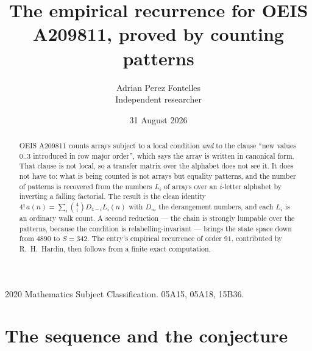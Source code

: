\documentclass[11pt,a4paper]{article}
\title{The empirical recurrence for OEIS A209811, proved by counting patterns}
\author{Adrian Perez Fontelles\\ \small Independent researcher}
\date{31 August 2026}
\theoremstyle{plain}
\theoremstyle{definition}
\begin{document}
\maketitle

\begin{abstract}
OEIS A209811 counts arrays subject to a local condition \emph{and} to the clause ``new values
$0..3$ introduced in row major order'', which says the array is written in canonical
form. That clause is not local, so a transfer matrix over the alphabet does not see it. It
does not have to: what is being counted is not arrays but equality patterns, and the number
of patterns is recovered from the numbers $L_i$ of arrays over an $i$-letter alphabet by
inverting a falling factorial. The result is the clean identity
$4!\,a(n)=\sum_i\binom{4}{i}D_{4-i}L_i(n)$ with $D_m$ the derangement numbers,
and each $L_i$ is an ordinary walk count. A second reduction --- the chain is strongly
lumpable over the patterns, because the condition is relabelling-invariant --- brings the
state space down from $4890$ to $S=342$. The entry's empirical recurrence of order
$91$, contributed by R.~H.~Hardin, then follows from a finite exact computation.
\end{abstract}

\noindent\small 2020 Mathematics Subject Classification. 05A15, 05A18, 15B36.\normalsize

\section{The sequence and the conjecture}
\end{document}

